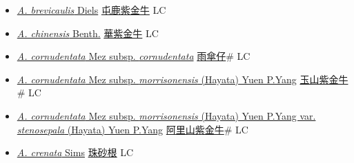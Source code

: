 \begin{itemize}
  \begin{itemize}
        \item[] \href{http://www.theplantlist.org/tpl1.1/search?q=Ardisia+brevicaulis}{\textit{A. brevicaulis} Diels}   \href{\detokenize{http://taibnet.sinica.edu.tw/chi/taibnet_species_list.php?T2=屯鹿紫金牛&T2_new_value=true&fr=y}}{屯鹿紫金牛} LC
        \item[] \href{http://www.theplantlist.org/tpl1.1/search?q=Ardisia+chinensis}{\textit{A. chinensis} Benth.}   \href{\detokenize{http://taibnet.sinica.edu.tw/chi/taibnet_species_list.php?T2=華紫金牛&T2_new_value=true&fr=y}}{華紫金牛} LC
        \item[] \href{http://www.theplantlist.org/tpl1.1/search?q=Ardisia+cornudentata+subsp.+cornudentata}{\textit{A. cornudentata} Mez subsp. \textit{cornudentata}}   \href{\detokenize{http://taibnet.sinica.edu.tw/chi/taibnet_species_list.php?T2=雨傘仔&T2_new_value=true&fr=y}}{雨傘仔}\# LC
        \item[] \href{http://www.theplantlist.org/tpl1.1/search?q=Ardisia+cornudentata+subsp.+morrisonensis}{\textit{A. cornudentata} Mez subsp. \textit{morrisonensis} (Hayata) Yuen P.Yang}   \href{\detokenize{http://taibnet.sinica.edu.tw/chi/taibnet_species_list.php?T2=玉山紫金牛&T2_new_value=true&fr=y}}{玉山紫金牛}\# LC
        \item[] \href{http://www.theplantlist.org/tpl1.1/search?q=Ardisia+cornudentata+subsp.+morrisonensis+var.+stenosepala}{\textit{A. cornudentata} Mez subsp. \textit{morrisonensis} (Hayata) Yuen P.Yang var. \textit{stenosepala} (Hayata) Yuen P.Yang}   \href{\detokenize{http://taibnet.sinica.edu.tw/chi/taibnet_species_list.php?T2=阿里山紫金牛&T2_new_value=true&fr=y}}{阿里山紫金牛}\# LC
        \item[] \href{http://www.theplantlist.org/tpl1.1/search?q=Ardisia+crenata}{\textit{A. crenata} Sims}   \href{\detokenize{http://taibnet.sinica.edu.tw/chi/taibnet_species_list.php?T2=珠砂根&T2_new_value=true&fr=y}}{珠砂根} LC

\end{itemize}
\end{itemize}
